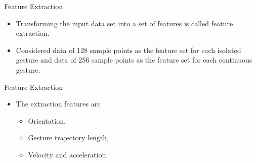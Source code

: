 \documentclass{beamer}
\begin{document}
\begin{frame}{Feature Extraction}

\begin{itemize}
\item Transforming the input data set into a set of
features is called feature extraction.
\linebreak
\item Considered data of 128 sample points as the feature set for each isolated gesture and data of 256 sample points as the
feature set for each continuous gesture.
\end{itemize}

\end{frame}

\begin{frame}{Feature Extraction}
\begin{itemize}
\item The extraction features are
\linebreak
\begin{itemize}
\item Orientation.
\linebreak
\item Gesture trajectory length,
\linebreak
\item Velocity and acceleration.
\end{itemize}
\end{itemize}
\end{frame}
\end{document}
